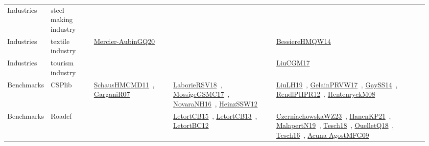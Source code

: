 {\begin{longtable}{lp{3cm}>{\raggedright\arraybackslash}p{6cm}>{\raggedright\arraybackslash}p{6cm}>{\raggedright\arraybackslash}p{8cm}}
Industries & steel making industry &  &  & \\
Industries & textile industry & \href{papers/Mercier-AubinGQ20.pdf}{Mercier-AubinGQ20}~\cite{Mercier-AubinGQ20} &  & \href{papers/BessiereHMQW14.pdf}{BessiereHMQW14}~\cite{BessiereHMQW14}\\
Industries & tourism industry &  &  & \href{papers/LiuCGM17.pdf}{LiuCGM17}~\cite{LiuCGM17}\\
Benchmarks & CSPlib & \href{articles/SchausHMCMD11.pdf}{SchausHMCMD11}~\cite{SchausHMCMD11}, \href{papers/GarganiR07.pdf}{GarganiR07}~\cite{GarganiR07} & \href{articles/LaborieRSV18.pdf}{LaborieRSV18}~\cite{LaborieRSV18}, \href{papers/MossigeGSMC17.pdf}{MossigeGSMC17}~\cite{MossigeGSMC17}, \href{articles/NovaraNH16.pdf}{NovaraNH16}~\cite{NovaraNH16}, \href{articles/HeinzSSW12.pdf}{HeinzSSW12}~\cite{HeinzSSW12} & \href{papers/LiuLH19.pdf}{LiuLH19}~\cite{LiuLH19}, \href{papers/GelainPRVW17.pdf}{GelainPRVW17}~\cite{GelainPRVW17}, \href{papers/GaySS14.pdf}{GaySS14}~\cite{GaySS14}, \href{papers/RendlPHPR12.pdf}{RendlPHPR12}~\cite{RendlPHPR12}, \href{papers/HentenryckM08.pdf}{HentenryckM08}~\cite{HentenryckM08}\\
Benchmarks & Roadef &  & \href{articles/LetortCB15.pdf}{LetortCB15}~\cite{LetortCB15}, \href{papers/LetortCB13.pdf}{LetortCB13}~\cite{LetortCB13}, \href{papers/LetortBC12.pdf}{LetortBC12}~\cite{LetortBC12} & \href{articles/CzerniachowskaWZ23.pdf}{CzerniachowskaWZ23}~\cite{CzerniachowskaWZ23}, \href{papers/HanenKP21.pdf}{HanenKP21}~\cite{HanenKP21}, \href{papers/MalapertN19.pdf}{MalapertN19}~\cite{MalapertN19}, \href{papers/Tesch18.pdf}{Tesch18}~\cite{Tesch18}, \href{papers/OuelletQ18.pdf}{OuelletQ18}~\cite{OuelletQ18}, \href{papers/Tesch16.pdf}{Tesch16}~\cite{Tesch16}, \href{papers/Acuna-AgostMFG09.pdf}{Acuna-AgostMFG09}~\cite{Acuna-AgostMFG09}\\

\end{longtable}}
